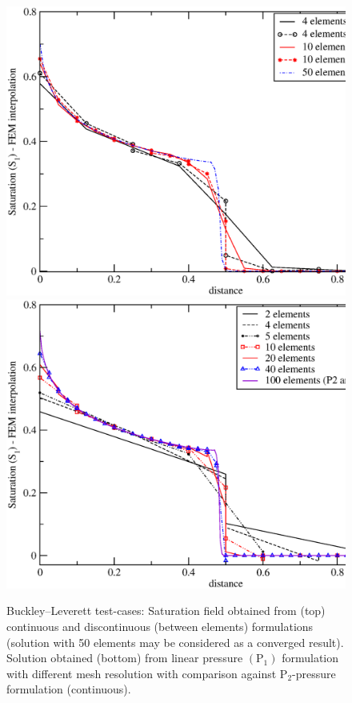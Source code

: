 \begin{figure}[h]
\vbox{
\hbox{\hspace{.3cm}\includegraphics[width=.9\textwidth]{diagrams/bl-dg-4-10-vers-cty.eps}}
\vspace{-0.cm}
\hbox{\hspace{.3cm}\includegraphics[width=.9\textwidth]{diagrams/bl-dg-p1-2-4-5-10-20-40.eps}}}
\caption{Buckley--Leverett test-cases: Saturation field obtained from (top) continuous and discontinuous (between elements) formulations (solution with 50 elements may be considered as a converged result). Solution obtained (bottom) from linear pressure $\left(\text{P}_{1}\right)$ formulation with different mesh resolution with comparison against P$_{2}$-pressure formulation (continuous). \label{bl-dg-4-10-vers-cty}}
\end{figure}

